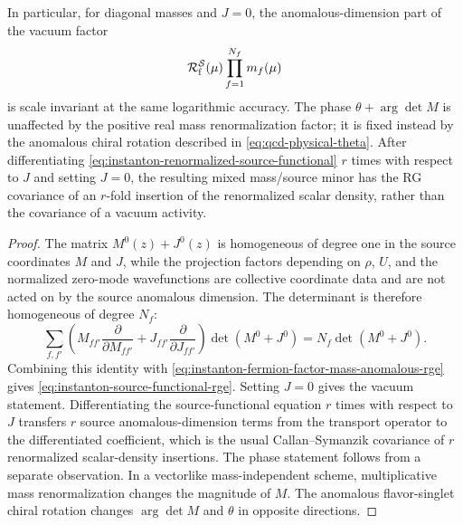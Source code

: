 \begin{proposition}
In particular, for diagonal masses and \(J=0\), the anomalous-dimension part
of the vacuum factor
\[
  \mathcal R_{\rm f}^{\mathcal S}(\mu)\prod_{f=1}^{N_f}m_f(\mu)
\]
is scale invariant at the same logarithmic accuracy.  The phase
\(\theta+\arg\det M\) is unaffected by the positive real mass
renormalization factor; it is fixed instead by the anomalous chiral rotation
described in \eqref{eq:qcd-physical-theta}.  After differentiating
\eqref{eq:instanton-renormalized-source-functional} \(r\) times with respect
to \(J\) and setting \(J=0\), the resulting mixed mass/source minor has the
RG covariance of an \(r\)-fold insertion of the renormalized scalar density,
rather than the covariance of a vacuum activity.
\end{proposition}

\begin{proof}
The matrix \(M^0(z)+J^0(z)\) is homogeneous of degree one in the source
coordinates \(M\) and \(J\), while the projection factors depending on
\(\rho\), \(U\), and the normalized zero-mode wavefunctions are collective
coordinate data and are not acted on by the source anomalous dimension.  The
determinant is therefore homogeneous of degree \(N_f\):
\[
  \sum_{f,f'}
  \left(
    M_{ff'}\frac{\partial}{\partial M_{ff'}}
    +J_{ff'}\frac{\partial}{\partial J_{ff'}}
  \right)
  \det(M^0+J^0)
  =
  N_f\det(M^0+J^0).
\]
Combining this identity with
\eqref{eq:instanton-fermion-factor-mass-anomalous-rge} gives
\eqref{eq:instanton-source-functional-rge}.  Setting \(J=0\) gives the
vacuum statement.  Differentiating the source-functional equation \(r\) times
with respect to \(J\) transfers \(r\) source anomalous-dimension terms from
the transport operator to the differentiated coefficient, which is the usual
Callan--Symanzik covariance of \(r\) renormalized scalar-density insertions.
The phase statement follows from a separate observation.  In a vectorlike
mass-independent scheme, multiplicative mass renormalization changes the
magnitude of \(M\).  The anomalous flavor-singlet chiral rotation changes
\(\arg\det M\) and \(\theta\) in opposite directions.
\end{proof}

